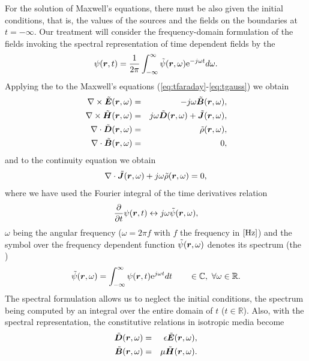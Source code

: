 \par For the solution of Maxwell's equations, there must be also given the initial conditions, that is, the values of the sources and the fields on the boundaries at $t=-\infty$. Our treatment will consider the frequency-domain formulation of the fields invoking the spectral representation of time dependent fields by the   $${\psi}(\mbfit{r},t) = \frac{1}{2\pi} \int_{-\infty}^{\infty} \tilde{\psi} (\mbfit{r}, \omega) \mrm{e}^{-j\omega t} d\omega.$$ Applying the  to the Maxwell's equations (\ref{eq:tfaraday}-\ref{eq:tgauss}) we obtain
\begin{eqnarray}
\nabla \times \tilde{\mbfit{E}}(\mbfit{r},\omega) &= & -j\omega\tilde{\mbfit{B}}(\mbfit{r},\omega), \label{eq:ffaraday} \\
\nabla \times \tilde{\mbfit{H}}(\mbfit{r},\omega) &= & j\omega\tilde{\mbfit{D}}(\mbfit{r},\omega) + \tilde{\mbfit{J}}(\mbfit{r},\omega), \label{eq:fampere} \\
\nabla \cdot \tilde{\mbfit{D}}(\mbfit{r},\omega) &= & \tilde{\rho}(\mbfit{r},\omega), \label{eq:fpoisson}\\
\nabla \cdot \tilde{\mbfit{B}}(\mbfit{r},\omega) &= & 0,\label{eq:fgauss}
\end{eqnarray}
and to the continuity equation we obtain
\begin{equation}
\nabla \cdot \tilde{\mbfit{J}}(\mbfit{r},\omega) + j \omega \tilde{\rho}(\mbfit{r},\omega) = 0, \label{eq:contJ}
\end{equation}
where we have used the Fourier integral of the time derivatives relation $$\frac{\partial}{\partial{t}}{\psi}(\mbfit{r},t) \leftrightarrow j\omega \tilde{\psi} (\mbfit{r}, \omega),$$
$\omega$ being the angular frequency ($\omega = 2 \pi f$ with $f$ the frequency in $\mathrm{[Hz]}$) and the symbol \quotes{\textasciitilde} over the frequency dependent function $\tilde{\psi}(\mbfit{r},\omega)$ denotes its spectrum  (the ) $$\tilde{\psi} (\mbfit{r}, \omega) = \int_{-\infty}^{\infty} {\psi}(\mbfit{r},t) \mrm{e}^{j\omega t} dt \qquad \in \mathbb{C}, \ \forall \omega \in \mathbb{R}.$$ The spectral formulation allows us to neglect the initial conditions, the spectrum being computed by an integral over the entire domain of $t$ ($t \in \mathbb{R}$).
Also, with the spectral representation, the constitutive relations in isotropic media become
\begin{eqnarray}
\tilde{\mbfit{D}}(\mbfit{r},\omega) &= & \epsilon \tilde{\mbfit{E}}(\mbfit{r},\omega),  \label{eq:ffsconst1}\\
\tilde{\mbfit{B}}(\mbfit{r},\omega) &= & \mu \tilde{\mbfit{H}}(\mbfit{r},\omega). \label{eq:ffsconst2}
\end{eqnarray}

